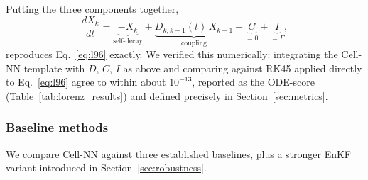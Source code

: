 \documentclass[final,5p,times,twocolumn,authoryear]{elsarticle}
\begin{document}
Putting the three components together,
\begin{equation}
\frac{dX_k}{dt} = \underbrace{-X_k}_{\text{self-decay}} +
\underbrace{D_{k,k-1}(t)\,X_{k-1}}_{\text{coupling}} +
\underbrace{C}_{=0} + \underbrace{I}_{=F},
\end{equation}
reproduces Eq.~\eqref{eq:l96} exactly. We verified this numerically:
integrating the Cell-NN template with $D$, $C$, $I$ as above and
comparing against RK45 applied directly to Eq.~\eqref{eq:l96} agree
to within about $10^{-13}$, reported as the ODE-score
(Table~\ref{tab:lorenz_results}) and defined precisely in
Section~\ref{sec:metrics}.

\subsubsection{Baseline methods}
\label{sec:baselines}

We compare Cell-NN against three established baselines, plus a
stronger EnKF variant introduced in Section~\ref{sec:robustness}.
\end{document}

